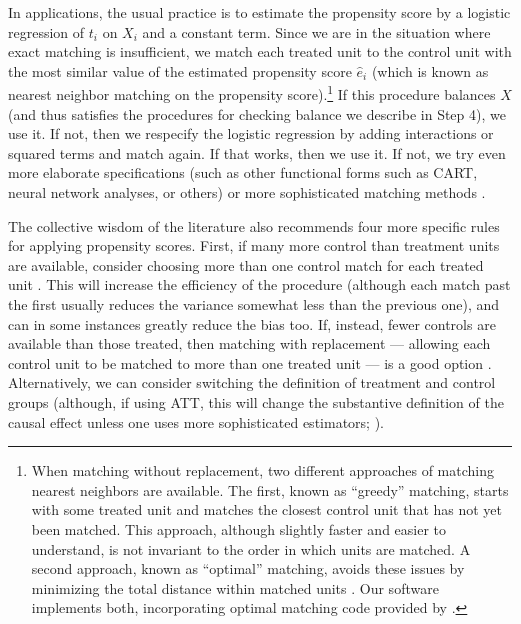 \documentclass[11pt,titlepage]{article}
\begin{document}
In applications, the usual practice is to estimate the propensity
score by a logistic regression of $t_i$ on $X_i$ and a constant term.
Since we are in the situation where exact matching is insufficient, we
match each treated unit to the control unit with the most similar
value of the estimated propensity score $\hat{e}_i$ (which is known as
nearest neighbor matching on the propensity score).\footnote{When
  matching without replacement, two different approaches of matching
  nearest neighbors are available. The first, known as ``greedy''
  matching, starts with some treated unit and matches the closest
  control unit that has not yet been matched.  This approach, although
  slightly faster and easier to understand, is not invariant to the
  order in which units are matched.  A second approach, known as
  ``optimal'' matching, avoids these issues by minimizing the total
  distance within matched units \citep[e.g.,][]{Rosenbaum89}.  Our
  software implements both, incorporating optimal matching code
  provided by \citet{Hansen04}.}  If this procedure balances $X$ (and
thus satisfies the procedures for checking balance we describe in Step
4), we use it.  If not, then we respecify the logistic regression by
adding interactions or squared terms and match again.  If that works,
then we use it.  If not, we try even more elaborate specifications
(such as other functional forms such as CART, neural network analyses,
or others) or more sophisticated matching methods
\citep{Frolich04,SmiTod05}.

The collective wisdom of the literature also recommends four more
specific rules for applying propensity scores.  First, if many more
control than treatment units are available, consider choosing more
than one control match for each treated unit \citep{Smith97}.  This
will increase the efficiency of the procedure (although each match
past the first usually reduces the variance somewhat less than the
previous one), and can in some instances greatly reduce the bias too.
If, instead, fewer controls are available than those treated, then
matching with replacement --- allowing each control unit to be matched
to more than one treated unit --- is a good option \citep{DehWah99}.
Alternatively, we can consider switching the definition of treatment
and control groups (although, if using ATT, this will change the
substantive definition of the causal effect unless one uses more
sophisticated estimators; \citealt{Lechner00}).
\end{document}

